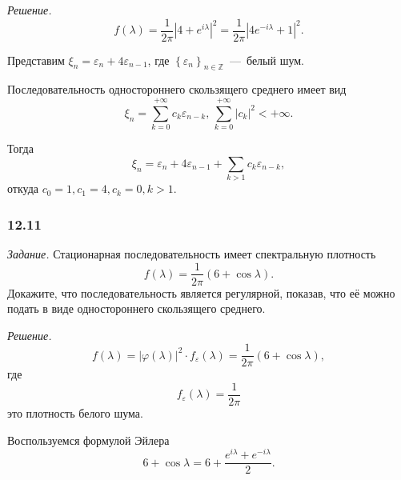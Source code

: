\textit{Решение.}
\begin{equation*}
  f \left( \lambda \right) =
  \frac{1}{2 \pi } \left| 4 + e^{i \lambda } \right|^2 =
  \frac{1}{2 \pi } \left| 4e^{-i \lambda } + 1 \right|^2.
\end{equation*}

Представим $ \xi_n = \varepsilon_n + 4 \varepsilon_{n - 1}$,
где $ \left\{ \varepsilon_n \right\}_{n \in \mathbb{Z}}$~---~белый шум.

Последовательность одностороннего скользящего среднего имеет вид
\begin{equation*}
  \xi_n = \sum \limits_{k = 0}^{+\infty } c_k \varepsilon_{n - k}, \,
  \sum \limits_{k = 0}^{+\infty } \left| c_k \right|^2 < +\infty.
\end{equation*}

Тогда
\begin{equation*}
  \xi_n =
  \varepsilon_n + 4 \varepsilon_{n - 1} + \sum \limits_{k > 1} c_k \varepsilon_{n - k},
\end{equation*}
откуда $c_0 = 1, c_1 = 4, c_k = 0, k > 1$.

\subsubsection*{12.11}

\textit{Задание.}
Стационарная последовательность имеет спектральную плотность
\begin{equation*}
  f \left( \lambda \right) =
  \frac{1}{2 \pi } \left( 6 + \cos \lambda \right).
\end{equation*}
Докажите, что последовательность является регулярной, показав,
что её можно подать в виде одностороннего скользящего среднего.

\textit{Решение.}
\begin{equation*}
  f \left( \lambda \right) =
  \left| \varphi \left( \lambda \right) \right|^2 \cdot f_{ \varepsilon } \left( \lambda \right) =
  \frac{1}{2 \pi } \left( 6 + \cos \lambda \right),
\end{equation*}
где
\begin{equation*}
  f_{ \varepsilon } \left( \lambda \right) =
  \frac{1}{2 \pi }
\end{equation*}
это плотность белого шума.

Воспользуемся формулой Эйлера
\begin{equation*}
  6 + \cos \lambda =
  6 + \frac{e^{i \lambda } + e^{-i \lambda }}{2}.
\end{equation*}

